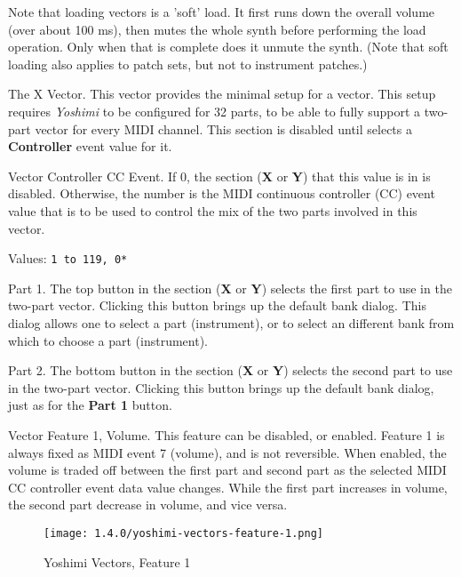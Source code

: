    Note that loading vectors is a 'soft' load. It first runs down the overall
   volume (over about 100 ms), then mutes the whole synth before performing
   the load operation. Only when that is complete does it unmute the synth.
   (Note that soft loading also applies to patch sets, but not to instrument
   patches.)

   The X Vector.
   This vector provides the minimal setup for a vector.  This setup requires
   \textsl{Yoshimi} to be configured for 32 parts, to be able to fully support
   a two-part vector for every MIDI channel.  This section is disabled until
   selects a \textbf{Controller} event value for it.

   Vector Controller CC Event.
   If 0, the section (\textbf{X} or \textbf{Y}) that this value is in is
   disabled.  Otherwise, the number is the MIDI continuous controller (CC)
   event value that is to be used to control the mix of the two parts involved
   in this vector.

   Values: \texttt{1 to 119, 0*}

   Part 1.
   The top button in the section (\textbf{X} or \textbf{Y}) selects the first
   part to use in the two-part vector.  Clicking this button brings up the
   default bank dialog.  This dialog allows one to select a part (instrument),
   or to select an different bank from which to choose a part (instrument).

   Part 2.
   The bottom button in the section (\textbf{X} or \textbf{Y}) selects the
   second part to use in the two-part vector.  Clicking this button brings up
   the default bank dialog, just as for the \textbf{Part 1} button.

   Vector Feature 1, Volume.
   This feature can be disabled, or enabled.  Feature 1 is always fixed as MIDI
   event 7 (volume), and is not reversible.
   When enabled, the volume is traded off between the first part and second part
   as the selected MIDI CC controller event data value changes.
   While the first part increases in volume, the second part decrease in
   volume, and vice versa.

\begin{figure}[H]
   \centering
   \texttt{[image: 1.4.0/yoshimi-vectors-feature-1.png]}
   \caption{Yoshimi Vectors, Feature 1}
   \label{fig:yoshimi_vectors_feature_1}
\end{figure}

